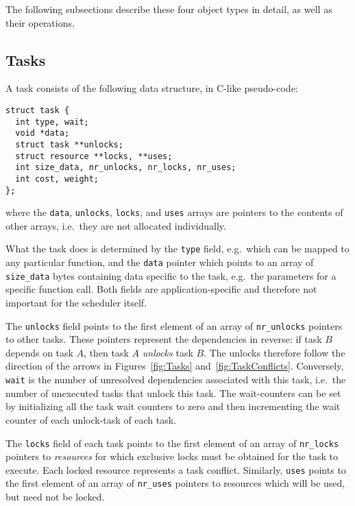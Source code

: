 \documentclass[preprint]{elsarticle}
\newcommand{\figs}[2]
    {Figures~\ref{fig:#1} and~\ref{fig:#2}}
\begin{document}
The following subsections describe these four object types
in detail, as well as their operations.


\subsection{Tasks}
\label{sec:tasks}

A task consists of the following data structure, in C-like pseudo-code:

\begin{center}\begin{minipage}{0.9\textwidth}
    \begin{lstlisting}
struct task {
  int type, wait;
  void *data;
  struct task **unlocks;
  struct resource **locks, **uses;
  int size_data, nr_unlocks, nr_locks, nr_uses;
  int cost, weight;
};
    \end{lstlisting}
\end{minipage}\end{center}
\noindent where the {\tt data}, {\tt unlocks}, {\tt locks},
and {\tt uses} arrays are pointers to the contents of other
arrays, i.e.~they are not allocated individually.

What the task does is determined by the {\tt type}
field, e.g.~which can be mapped to any particular function,
and the {\tt data} pointer which points to an array of
{\tt size\_data} bytes containing data specific to the task,
e.g.~the parameters for a specific function call.
Both fields are application-specific and therefore not
important for the scheduler itself.

The {\tt unlocks} field points to the first element of
an array of {\tt nr\_unlocks} pointers to other tasks.
These pointers represent the dependencies in reverse:
if task $B$ depends on task $A$, then task $A$ {\em unlocks}
task $B$.
The unlocks therefore follow the direction of the arrows
in \figs{Tasks}{TaskConflicts}.
Conversely, {\tt wait} is the number of unresolved dependencies
associated with this task, i.e.~the number of unexecuted tasks
that unlock this task.
The wait-counters can
be set by initializing all the task wait counters to zero and then
incrementing the wait counter of each unlock-task of each task.

The {\tt locks} field of each task points to the first element of
an array of {\tt nr\_locks} pointers to {\em resources}
for which exclusive locks must be obtained for the task
to execute.
Each locked resource represents a task conflict.
Similarly, {\tt uses} points to the first element of
an array of {\tt nr\_uses} pointers to resources which
will be used, but need not be locked.
\end{document}
